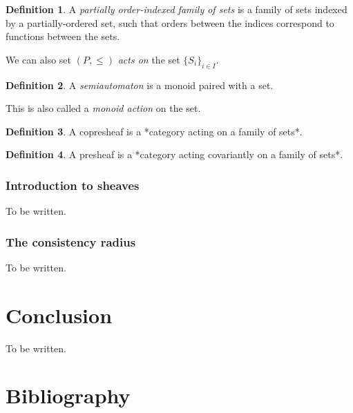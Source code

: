 \documentclass[]             %
{NASA}                       %
\theoremstyle{definition}
\newtheorem{definition}{Definition}[section]
\begin{document}
\begin{definition}
  A \emph{partially order-indexed family of sets} is a family of sets indexed by a partially-ordered set,
  such that orders between the indices correspond to functions between the sets.
\end{definition}

We can also set \((P, \leq)\) \emph{acts on} the set
\(\{S_i\}_{i \in I}\).

\begin{definition}
  A \emph{semiautomaton} is a monoid paired with a set.
\end{definition}

This is also called a \emph{monoid action} on the set.

\begin{definition}
  A copresheaf is a *category acting on a family of sets*.
\end{definition}

\begin{definition}
  A presheaf is a *category acting covariantly on a family of sets*.
\end{definition}

\subsubsection{Introduction to sheaves}
\label{introduction-to-sheaves}

To be written.

\subsubsection{The consistency radius}
\label{the-consistency-radius}

To be written.

\section{Conclusion}
\label{conclusion}

\label{sec:conclusion}

To be written.

\section*{Bibliography}\label{bibliography}



\end{document}
